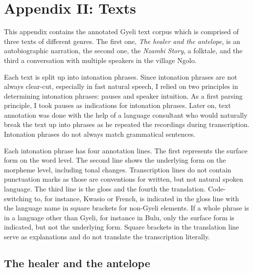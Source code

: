 

\renewcommand{\thechapter}{\Roman{chapter}} 

\setcounter{chapter}{2}

\setcounter{section}{0}

\chapter*{Appendix II: Texts} 
\label{sec:AppendixII}


This appendix contains the annotated Gyeli text corpus which is comprised of three texts of different genres. The first one, {\itshape The healer and the antelope}, is an autobiographic narration, the second one, the {\itshape Nzambi Story}, a folktale, and the third a conversation with multiple speakers in the village Ngolo. 

Each text is split up into intonation phrases. Since intonation phrases are not always clear-cut, especially in fast natural speech, I relied on two principles in determining intonation phrases: pauses and speaker intuition. As a first parsing principle, I took pauses as indications for intonation phrases. Later on, text annotation was done with the help of a language consultant who would naturally break the text up into phrases as he repeated the recordings during transcription.
Intonation phrases do not always match grammatical sentences. 

Each intonation phrase has four annotation lines. The first represents the surface form on the word level. The second line shows the underlying form on the morpheme level, including tonal changes. Transcription lines do not contain punctuation marks as those are conventions for written, but not natural spoken language. The third line is the gloss and the fourth the translation. Code-switching to, for instance, Kwasio or French, is indicated in the gloss line with the language name in square brackets for non-Gyeli elements. If a whole phrase is in a language other than Gyeli, for instance in Bulu, only the surface form is indicated, but not the underlying form. Square brackets in the translation line serve as explanations and do not translate the transcription literally.





\section{The healer and the antelope}
\label{sec:Antelope}

